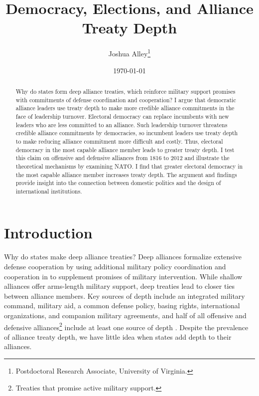 \documentclass[12pt]{article}
\title{\textbf{Democracy, Elections, and Alliance Treaty Depth}}
\author{Joshua Alley\footnote{Postdoctoral Research Associate,
University of Virginia.}}
\date{\today}
\begin{document}
\maketitle 

\doublespace 

\begin{abstract}
Why do states form deep alliance treaties, which reinforce military support promises with commitments of defense coordination and cooperation? 
I argue that democratic alliance leaders use treaty depth to make more credible alliance commitments in the face of leadership turnover. 
Electoral democracy can replace incumbents with new leaders who are less committed to an alliance. 
Such leadership turnover threatens credible alliance commitments by democracies, so incumbent leaders use treaty depth to make reducing alliance commitment more difficult and costly. 
Thus, electoral democracy in the most capable alliance member leads to greater treaty depth.
I test this claim on offensive and defensive alliances from 1816 to 2012 and illustrate the theoretical mechanisms by examining NATO.
I find that greater electoral democracy in the most capable alliance member increases treaty depth. 
The argument and findings provide insight into the connection between domestic politics and the design of international institutions. 
\end{abstract}


\newpage 


\section{Introduction}


Why do states make deep alliance treaties? 
Deep alliances formalize extensive defense cooperation by using additional military policy coordination and cooperation in to supplement promises of military intervention. 
While shallow alliances offer arms-length military support, deep treaties lead to closer ties between alliance members. 
Key sources of depth include an integrated military command, military aid, a common defense policy, basing rights, international organizations, and companion military agreements, and half of all offensive and defensive alliances\footnote{Treaties that promise active military support.} include at least one source of depth \citep{Leedsetal2002}. 
Despite the prevalence of alliance treaty depth, we have little idea when states add depth to their alliances. 
\end{document}
